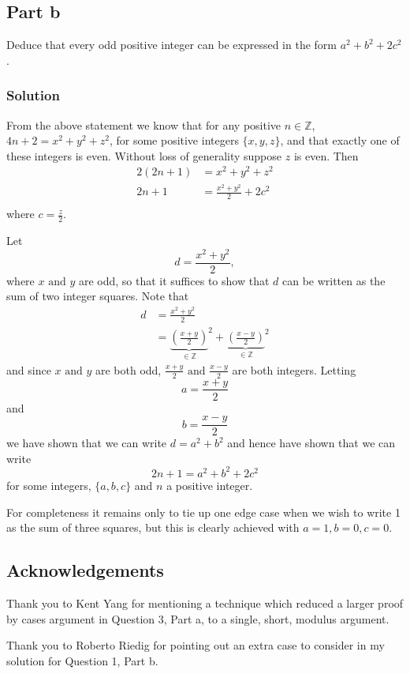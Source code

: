 \documentclass{unswmaths}
\begin{document}
\subsection*{Part b}
Deduce that every odd positive integer can be expressed in the form $ a^2 + b^2 + 2c^2 $.
\subsubsection*{Solution}
From the above statement we know that for any positive $ n \in \mathbb{Z} $, 
$ 4n + 2 = x^2 + y^2 + z^2 $, for some positive integers $ \{ x, y, z \} $, and that exactly
one of these integers is even. Without loss of generality suppose $ z $ is even.  Then
\begin{align*}
	2(2n + 1) &= x^2 + y^2 +z^2 \\
	2n + 1 &= \frac{x^2 + y^2}{2} + 2c^2 \\
\end{align*}
where $ c = \frac{z}{2} $.

Let $$ d = \frac{x^2 + y^2}{2}, $$ where $ x \text{ and } y $ are odd, so that it suffices to show that $ d $ can be written as 
the sum of two integer squares.
Note that 
\begin{align*}
	d 	 	    &= \frac{x^2 + y^2}{2} \\
			    &= 	{\underbrace{\left( \frac{x + y}{2} \right)}_{\in \mathbb{Z}}}^2 + 
		              	{\underbrace{\left( \frac{x - y}{2} \right)}_{\in \mathbb{Z}}}^2
\end{align*}
and since $ x \text{ and } y $ are both odd, $ \frac{x+y}{2} \text{ and } \frac{x-y}{2} $ are both integers.
Letting 
$$ a = \frac{x+y}{2} $$
and
$$ b = \frac{x-y}{2} $$
we have shown that we can write $ d = a^2 + b^2 $ and hence have shown that we can write
$$ 2n + 1 = a^2 + b^2 + 2c^2 $$ for some integers, $ \{ a, b, c \} $ and $ n $ a 
positive integer. 

For completeness it remains only to tie up one edge case when we wish to write 1 as the sum of three squares, 
but this is clearly achieved with $ a = 1, b = 0, c = 0 $. 
\subsection*{Acknowledgements}
Thank you to Kent Yang for mentioning a technique which reduced a larger proof by cases 
argument in Question 3, Part a, to a single, short, modulus argument.

Thank you to Roberto Riedig for pointing out an extra case to consider in my solution for Question 1, Part b.
\end{document}

